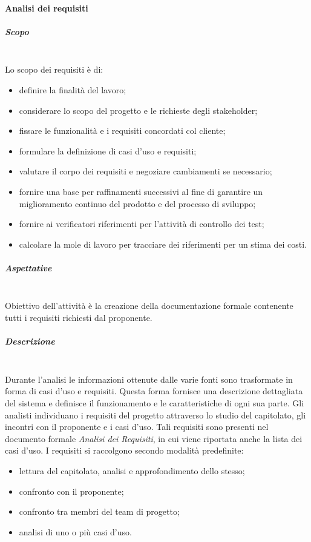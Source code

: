 		\paragraph{Analisi dei requisiti} 
			\subparagraph*{Scopo}  \mbox{}\\ 
			Lo scopo dei requisiti è di:
				\begin{itemize}
					\item definire la finalità del lavoro;
					\item considerare lo scopo del progetto e le richieste degli stakeholder;
					\item fissare le funzionalità e i requisiti concordati col cliente;
					\item formulare la definizione di casi d'uso e requisiti;
					\item valutare il corpo dei requisiti e negoziare cambiamenti se necessario;
					\item fornire  una  base  per  raffinamenti  successivi  al  fine  di garantire  un miglioramento continuo del prodotto e del processo di sviluppo;
					\item fornire ai verificatori riferimenti per l'attività di controllo dei test;
					\item calcolare la mole di lavoro per tracciare dei riferimenti per un stima dei costi.
				\end{itemize}	
			\subparagraph*{Aspettative} \mbox{}\\	
			\noindent Obiettivo dell'attività è la creazione della documentazione formale contenente tutti i requisiti richiesti dal proponente.			
			\subparagraph*{Descrizione} \mbox{}\\
			Durante l'analisi le informazioni ottenute dalle varie fonti sono trasformate in forma di casi d'uso e requisiti. Questa forma fornisce una descrizione dettagliata del sistema e definisce il funzionamento e le caratteristiche di ogni sua parte.\newline
			Gli analisti individuano i requisiti del progetto attraverso lo studio del capitolato, gli incontri con il proponente e i casi d'uso. Tali requisiti sono 	presenti nel documento formale \textit{Analisi dei Requisiti}, in cui viene riportata 	anche la lista dei casi d'uso. \newline
			\noindent I requisiti si raccolgono secondo modalità predefinite:
			\begin{itemize}
				\item lettura del capitolato\glo, analisi e approfondimento dello stesso;
				\item confronto con il proponente;
				\item confronto tra membri del team di progetto;
				\item analisi di uno o più casi d'uso.  \\
			\end{itemize}
			

